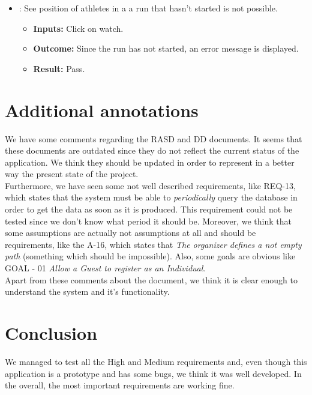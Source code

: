 \documentclass[a4paper, hidelinks, 12pt]{report}
\newcommand\test[1]{\item[{[TEST-#1]}] }
\begin{document}
\begin{itemize}
\begin{itemize}
\test{23} : See position of athletes in a a run that hasn't started is not possible.
				\begin{itemize}
			\item \textbf{Inputs: } Click on watch.
			\item \textbf{Outcome: } Since the run has not started, an error message is displayed.
			\item \textbf{Result: } Pass. 
			\end{itemize}

	\end{itemize}
	\end{itemize}

	\chapter{Additional annotations}
	\label{chap:additional_annotations}
	We have some comments regarding the RASD and DD documents. It seems that these documents are outdated since they do not reflect the current status of the application. We think they should be updated in order to represent in a better way the present state of the project.\\
	
	Furthermore, we have seen some not well described requirements, like REQ-13, which states that the system must be able to \textit{periodically} query the database in order to get the data as soon as it is produced. This requirement could not be tested since we don't know what period it should be. Moreover, we think that some assumptions are actually not assumptions at all and should be requirements, like the A-16, which states that \textit{The organizer defines a not empty path} (something which should be impossible). Also, some goals are obvious like GOAL - 01 \textit{Allow a Guest to register as an Individual}. \\
	
	Apart from these comments about the document, we think it is clear enough to understand the system and it's functionality.
	
	\chapter{Conclusion}
	We managed to test all the High and Medium requirements and, even though this application is a prototype and has some bugs, we think it was well developed. In the overall, the most important requirements are working fine.\\
	
\end{document}

